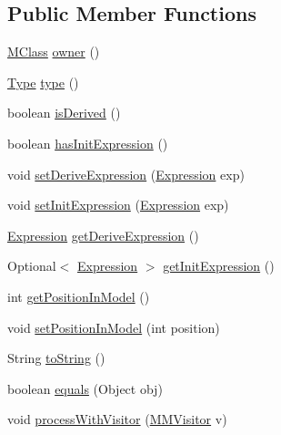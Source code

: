 \subsection*{Public Member Functions}
\begin{DoxyCompactItemize}
\item 
\hyperlink{interfaceorg_1_1tzi_1_1use_1_1uml_1_1mm_1_1_m_class}{M\-Class} \hyperlink{classorg_1_1tzi_1_1use_1_1uml_1_1mm_1_1_m_attribute_a5beda404f7ce28aeda3a9260936ce822}{owner} ()
\item 
\hyperlink{interfaceorg_1_1tzi_1_1use_1_1uml_1_1ocl_1_1type_1_1_type}{Type} \hyperlink{classorg_1_1tzi_1_1use_1_1uml_1_1mm_1_1_m_attribute_a60de2be9b62c7f0339f6bd51ef585468}{type} ()
\item 
boolean \hyperlink{classorg_1_1tzi_1_1use_1_1uml_1_1mm_1_1_m_attribute_a1bf4d89cbd797585692e04b01e8d05c4}{is\-Derived} ()
\item 
boolean \hyperlink{classorg_1_1tzi_1_1use_1_1uml_1_1mm_1_1_m_attribute_a20d1851d273258d582d1e2d42dbf1ec1}{has\-Init\-Expression} ()
\item 
void \hyperlink{classorg_1_1tzi_1_1use_1_1uml_1_1mm_1_1_m_attribute_a31d25e142670eb50b36399cf17b2813b}{set\-Derive\-Expression} (\hyperlink{classorg_1_1tzi_1_1use_1_1uml_1_1ocl_1_1expr_1_1_expression}{Expression} exp)
\item 
void \hyperlink{classorg_1_1tzi_1_1use_1_1uml_1_1mm_1_1_m_attribute_a189fff47054d4c18ee91f6c9266d08e7}{set\-Init\-Expression} (\hyperlink{classorg_1_1tzi_1_1use_1_1uml_1_1ocl_1_1expr_1_1_expression}{Expression} exp)
\item 
\hyperlink{classorg_1_1tzi_1_1use_1_1uml_1_1ocl_1_1expr_1_1_expression}{Expression} \hyperlink{classorg_1_1tzi_1_1use_1_1uml_1_1mm_1_1_m_attribute_a33e37d70d1f91a4dd8da683236980c8a}{get\-Derive\-Expression} ()
\item 
Optional$<$ \hyperlink{classorg_1_1tzi_1_1use_1_1uml_1_1ocl_1_1expr_1_1_expression}{Expression} $>$ \hyperlink{classorg_1_1tzi_1_1use_1_1uml_1_1mm_1_1_m_attribute_afc61da3c33839feea9ca6b0dbd61d7bb}{get\-Init\-Expression} ()
\item 
int \hyperlink{classorg_1_1tzi_1_1use_1_1uml_1_1mm_1_1_m_attribute_a4e500771748c62e7c99d0d7920d0f475}{get\-Position\-In\-Model} ()
\item 
void \hyperlink{classorg_1_1tzi_1_1use_1_1uml_1_1mm_1_1_m_attribute_a3907e45595ce298faf59658029455a87}{set\-Position\-In\-Model} (int position)
\item 
String \hyperlink{classorg_1_1tzi_1_1use_1_1uml_1_1mm_1_1_m_attribute_ae396e9f6c6dadd99ca0dbc01ffb43175}{to\-String} ()
\item 
boolean \hyperlink{classorg_1_1tzi_1_1use_1_1uml_1_1mm_1_1_m_attribute_a4a90b87815ba7feefe91b07a4af2d102}{equals} (Object obj)
\item 
void \hyperlink{classorg_1_1tzi_1_1use_1_1uml_1_1mm_1_1_m_attribute_a48c96ea3823a7a74cede4a47defc8d96}{process\-With\-Visitor} (\hyperlink{interfaceorg_1_1tzi_1_1use_1_1uml_1_1mm_1_1_m_m_visitor}{M\-M\-Visitor} v)
\end{DoxyCompactItemize}
